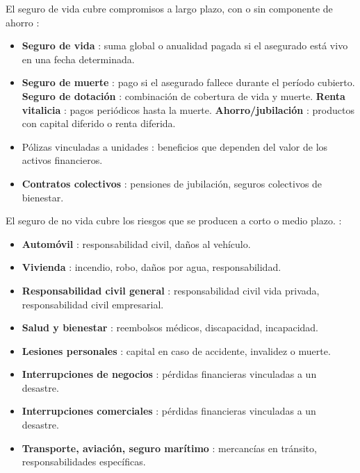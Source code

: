 \begin{f}
	
	El seguro de vida cubre compromisos a largo plazo, con o sin componente de ahorro :
	\begin{itemize}[nosep]
		\item \textbf{Seguro de vida} : suma global o anualidad pagada si el asegurado está vivo en una fecha determinada.
		\item \textbf{Seguro de muerte} : pago si el asegurado fallece durante el período cubierto.
		\textbf{Seguro de dotación} : combinación de cobertura de vida y muerte.
		\textbf{Renta vitalicia} : pagos periódicos hasta la muerte.
		\textbf{Ahorro/jubilación} : productos con capital diferido o renta diferida.
		\item Pólizas vinculadas a unidades : beneficios que dependen del valor de los activos financieros.
		\item \textbf{Contratos colectivos} : pensiones de jubilación, seguros colectivos de bienestar.
	\end{itemize}
	
	
	El seguro de no vida cubre los riesgos que se producen a corto o medio plazo. :
	\begin{itemize}[nosep]
		\item \textbf{Automóvil} : responsabilidad civil, daños al vehículo.
		\item \textbf{Vivienda} : incendio, robo, daños por agua, responsabilidad.
		\item \textbf{Responsabilidad civil general }: responsabilidad civil vida privada, responsabilidad civil empresarial.
		\item \textbf{Salud y bienestar} : reembolsos médicos, discapacidad, incapacidad.
		\item \textbf{Lesiones personales} : capital en caso de accidente, invalidez o muerte.
		\item \textbf{Interrupciones de negocios} : pérdidas financieras vinculadas a un desastre.
		\item \textbf{Interrupciones comerciales} : pérdidas financieras vinculadas a un desastre.
		\item \textbf{Transporte, aviación, seguro marítimo} : mercancías en tránsito, responsabilidades específicas.
	\end{itemize}
	

\end{f}
